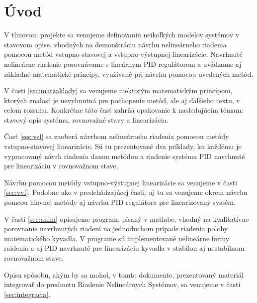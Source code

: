 \newpage
{}
{
	\section{Úvod}
}
{
}

    V tímovom projekte sa venujeme definovaniu neikoľkých modelov systémov v stavovom opise, vhodných na demonštráciu návrhu nelineárneho riadenia pomocou metód vstupno-stavovej a vstupno-výstupnej linearizácie. Navrhnuté nelineárne riadenie porovnávame s lineárnym PID regulátorom a uvádzame aj základné matematické princípy, využívané pri návrhu pomocou uvedených metód.

    V časti \ref{sec:matzaklady} sa venujeme niektorým matematickým princípom, ktorých znalosť je nevyhnutná pre pochopenie metód, ale aj ďalšieho textu, v celom rozsahu. Konkrétne táto časť zahrňa opakovanie k nasledujúcim témam: stavový opis systému, rovnovažné stavy a linearizácia. 
    
    Časť \ref{sec:vsl} sa zaoberá návrhom nelineárneho riadenia pomocou metódy vstupno-stavovej linearizácie. Sú tu prezentované dva príklady, ku každému je vypracovaný návrh riadenia danou metódou a riadenie systému PID navrhnuté pre linearizáciu v rovnovažnom stave.

    Návrhu pomocou metódy vstupno-výstupnej linearizácie sa venujeme v časti \ref{sec:vvl}. Podobne ako v predchádzajúcej časti, aj tu sa venujeme okrem návrhu pomcou hlavnej metódy aj návrhu PID regulátora pre linearizovaný systém.

    V časti \ref{sec:anim} opisujeme program, písaný v matlabe, vhodný na kvalitatívne porovnanie navrhnutých riadení na jednoduchom prípade riadenia polohy matematického kyvadla. V programe sú implementované nelineárne formy raidenia a aj PID navrhnuté pre linearizáciu kyvadla v stabilon aj nestabilnom rovnovažnom stave.

    Opisu spôsobu, akým by sa mohol, v tomto dokumente, prezentovaný materiál integrovať do predmetu Riadenie Nelineárnych Systémov, sa venujeme v časti \ref{sec:integracia}.
